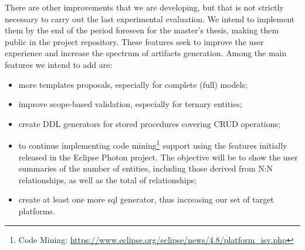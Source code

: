 There are other improvements that we are developing, but that is not strictly necessary to carry out the last experimental evaluation.
We intend to implement them by the end of the period foreseen for the master's thesis, making them public in the project repository.
These features seek to improve the user experience and increase the spectrum of artifacts generation.
Among the main features we intend to add are:

\begin{itemize}
    \item more templates proposals, especially for complete (full) models;
    \item improve scope-based validation, especially for ternary entities;
    \item create DDL generators for stored procedures covering CRUD operations;
    \item to continue implementing code mining\footnote{Code Mining: \url{https://www.eclipse.org/eclipse/news/4.8/platform_isv.php}} support using the features initially released in the Eclipse Photon project.
    The objective will be to show the user summaries of the number of entities, including those derived from N:N relationships, as well as the total of relationships;
    \item create at least one more \ac{sql} generator, thus increasing our set of target platforms.
\end{itemize}